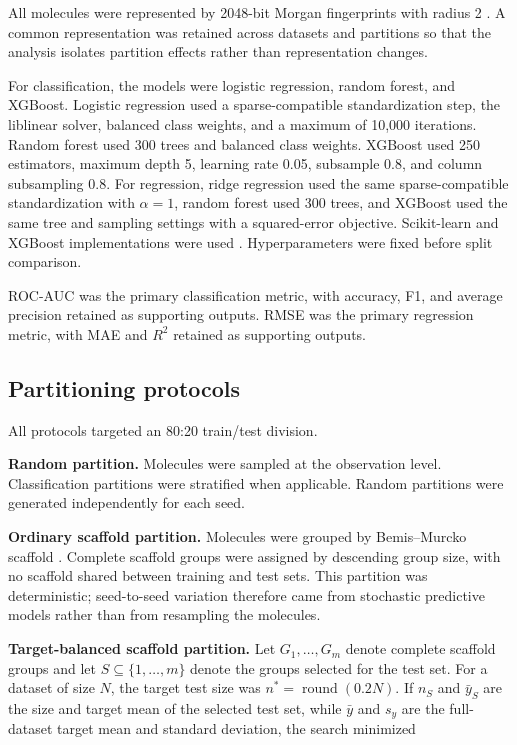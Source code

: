 All molecules were represented by 2048-bit Morgan fingerprints with radius 2 \citep{rogers2010extended}. A common representation was retained across datasets and partitions so that the analysis isolates partition effects rather than representation changes.

For classification, the models were logistic regression, random forest, and XGBoost. Logistic regression used a sparse-compatible standardization step, the liblinear solver, balanced class weights, and a maximum of 10,000 iterations. Random forest used 300 trees and balanced class weights. XGBoost used 250 estimators, maximum depth 5, learning rate 0.05, subsample 0.8, and column subsampling 0.8. For regression, ridge regression used the same sparse-compatible standardization with $\alpha=1$, random forest used 300 trees, and XGBoost used the same tree and sampling settings with a squared-error objective. Scikit-learn and XGBoost implementations were used \citep{pedregosa2011scikit,breiman2001random,chen2016xgboost}. Hyperparameters were fixed before split comparison.

ROC-AUC was the primary classification metric, with accuracy, F1, and average precision retained as supporting outputs. RMSE was the primary regression metric, with MAE and $R^2$ retained as supporting outputs.

\subsection{Partitioning protocols}

All protocols targeted an 80:20 train/test division.

\textbf{Random partition.} Molecules were sampled at the observation level. Classification partitions were stratified when applicable. Random partitions were generated independently for each seed.

\textbf{Ordinary scaffold partition.} Molecules were grouped by Bemis--Murcko scaffold \citep{bemis1996properties}. Complete scaffold groups were assigned by descending group size, with no scaffold shared between training and test sets. This partition was deterministic; seed-to-seed variation therefore came from stochastic predictive models rather than from resampling the molecules.

\textbf{Target-balanced scaffold partition.} Let $G_1,\ldots,G_m$ denote complete scaffold groups and let $S\subseteq\{1,\ldots,m\}$ denote the groups selected for the test set. For a dataset of size $N$, the target test size was $n^{*}=\operatorname{round}(0.2N)$. If $n_S$ and $\bar{y}_S$ are the size and target mean of the selected test set, while $\bar{y}$ and $s_y$ are the full-dataset target mean and standard deviation, the search minimized

